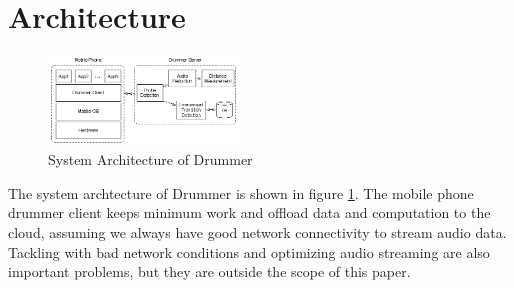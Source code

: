 \section{Architecture}
\label{sec:arch}


\begin{figure}[H]
\centering
\includegraphics[width=0.45\textwidth]{./fig/arch.eps}
\caption{System Architecture of Drummer}
\label{fig:arch}
\end{figure}


The system archtecture of Drummer is shown in figure \ref{fig:arch}. The mobile phone drummer 
client keeps minimum work and offload data and computation to the cloud, assuming we always
have good network connectivity to stream audio data. Tackling with bad network conditions 
\cite{cuervo2010maui} and optimizing audio streaming \cite{farleycsense} are also important 
problems, but they are outside the scope of this paper. 


